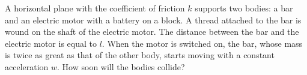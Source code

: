 \item A horizontal plane with the coefficient of friction \( k \) supports two bodies: a bar and an electric motor with a battery on a block. A thread attached to the bar is wound on the shaft of the electric motor. The distance between the bar and the electric motor is equal to \( l \). When the motor is switched on, the bar, whose mass is twice as great as that of the other body, starts moving with a constant acceleration \( w \). How soon will the bodies collide?